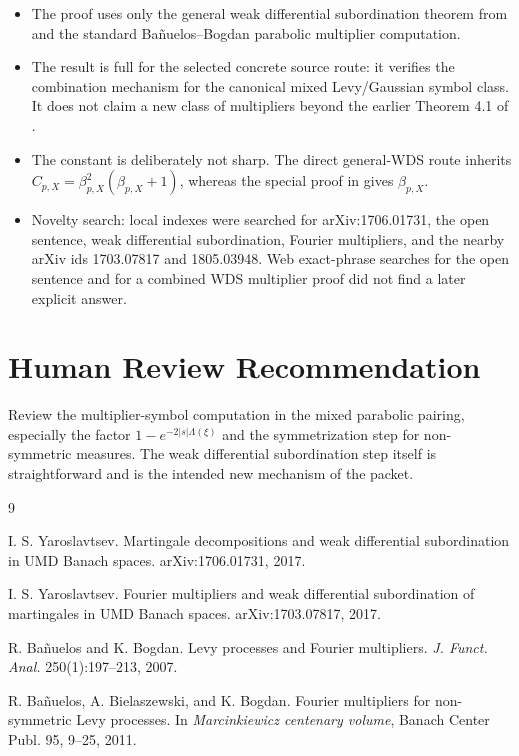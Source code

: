 \documentclass[11pt]{article}
\begin{document}
\begin{itemize}[leftmargin=2em]
\item The proof uses only the general weak differential subordination theorem
from \cite{Yaroslavtsev2017Decompositions} and the standard
Ba\~nuelos--Bogdan parabolic multiplier computation.
\item The result is full for the selected concrete source route: it verifies
the combination mechanism for the canonical mixed Levy/Gaussian symbol class.
It does not claim a new class of multipliers beyond the earlier Theorem 4.1 of
\cite{Yaroslavtsev2017Multipliers}.
\item The constant is deliberately not sharp.  The direct general-WDS route
inherits $C_{p,X}=\beta_{p,X}^2(\beta_{p,X}+1)$, whereas the special proof in
\cite{Yaroslavtsev2017Multipliers} gives $\beta_{p,X}$.
\item Novelty search: local indexes were searched for arXiv:1706.01731, the
open sentence, weak differential subordination, Fourier multipliers, and the
nearby arXiv ids 1703.07817 and 1805.03948.  Web exact-phrase searches for the
open sentence and for a combined WDS multiplier proof did not find a later
explicit answer.
\end{itemize}

\section*{Human Review Recommendation}

Review the multiplier-symbol computation in the mixed parabolic pairing,
especially the factor $1-e^{-2|s|\Lambda(\xi)}$ and the symmetrization step for
non-symmetric measures.  The weak differential subordination step itself is
straightforward and is the intended new mechanism of the packet.

\begin{thebibliography}{9}

I. S. Yaroslavtsev.
\newblock Martingale decompositions and weak differential subordination in UMD Banach spaces.
\newblock arXiv:1706.01731, 2017.

I. S. Yaroslavtsev.
\newblock Fourier multipliers and weak differential subordination of martingales in UMD Banach spaces.
\newblock arXiv:1703.07817, 2017.

R. Ba\~nuelos and K. Bogdan.
\newblock Levy processes and Fourier multipliers.
\newblock \emph{J. Funct. Anal.} 250(1):197--213, 2007.

R. Ba\~nuelos, A. Bielaszewski, and K. Bogdan.
\newblock Fourier multipliers for non-symmetric Levy processes.
\newblock In \emph{Marcinkiewicz centenary volume}, Banach Center Publ. 95, 9--25, 2011.

\end{thebibliography}
\end{document}
